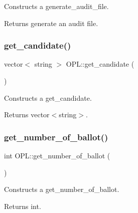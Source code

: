 Constructs a generate\+\_\+audit\+\_\+file. 

\begin{DoxyReturn}{Returns}
generate an audit file. 
\end{DoxyReturn}
\mbox{\label{classOPL_aa6f8d3ce7697842d956d9e6b95866dcf}} 
\subsubsection{\texorpdfstring{get\+\_\+candidate()}{get\_candidate()}}
{\footnotesize\ttfamily vector$<$ string $>$ O\+P\+L\+::get\+\_\+candidate (\begin{DoxyParamCaption}{ }\end{DoxyParamCaption})}



Constructs a get\+\_\+candidate. 

\begin{DoxyReturn}{Returns}
vector$<$string$>$. 
\end{DoxyReturn}
\mbox{\label{classOPL_a9409c14dcdc6fd849ff223b2fc71e913}} 
\subsubsection{\texorpdfstring{get\+\_\+number\+\_\+of\+\_\+ballot()}{get\_number\_of\_ballot()}}
{\footnotesize\ttfamily int O\+P\+L\+::get\+\_\+number\+\_\+of\+\_\+ballot (\begin{DoxyParamCaption}{ }\end{DoxyParamCaption})}



Constructs a get\+\_\+number\+\_\+of\+\_\+ballot. 

\begin{DoxyReturn}{Returns}
int. 
\end{DoxyReturn}
\mbox{\label{classOPL_ac8c59d0f260a307c105fe7a603c608c1}} 
